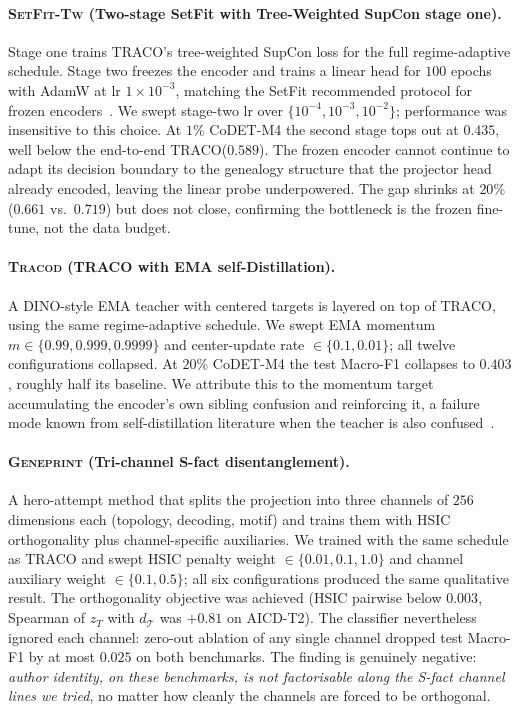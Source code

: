 ﻿\documentclass[11pt]{article}
\newcommand{\method}{\textsc{TRACO}\xspace}
\begin{document}
\paragraph{\textsc{SetFit-Tw} (Two-stage SetFit with Tree-Weighted
SupCon stage one).} Stage one trains \method's tree-weighted SupCon
loss for the full regime-adaptive schedule. Stage two freezes the
encoder and trains a linear head for $100$ epochs with AdamW at lr
$1\!\times\!10^{-3}$, matching the SetFit recommended protocol for
frozen encoders~\citep{tunstall2022setfit}. We swept stage-two lr
over $\{10^{-4}, 10^{-3}, 10^{-2}\}$; performance was insensitive
to this choice. At $1\%$ CoDET-M4 the second stage tops out at
$0.435$, well below the end-to-end \method ($0.589$). The frozen
encoder cannot continue to adapt its decision boundary to the
genealogy structure that the projector head already encoded, leaving
the linear probe underpowered. The gap shrinks at $20\%$ ($0.661$
vs.\ $0.719$) but does not close, confirming the bottleneck is the
frozen fine-tune, not the data budget.

\paragraph{\textsc{Tracod} (TRACO with EMA self-Distillation).} A
DINO-style EMA teacher with centered targets is layered on top of
\method, using the same regime-adaptive schedule. We swept EMA
momentum $m \in \{0.99, 0.999, 0.9999\}$ and center-update rate
$\in \{0.1, 0.01\}$; all twelve configurations collapsed.
At $20\%$ CoDET-M4 the test Macro-F1 collapses to $0.403$,
roughly half its baseline. We attribute this to the momentum target
accumulating the encoder's own sibling confusion and reinforcing it, a failure mode known from self-distillation literature when
the teacher is also confused~\citep{grill2020byol}.

\paragraph{\textsc{Geneprint} (Tri-channel S-fact disentanglement).}
A hero-attempt method that splits the projection into three
channels of $256$ dimensions each (topology, decoding, motif) and
trains them with HSIC orthogonality plus channel-specific
auxiliaries. We trained with the same schedule as \method and swept
HSIC penalty weight $\in \{0.01, 0.1, 1.0\}$ and channel auxiliary
weight $\in \{0.1, 0.5\}$; all six configurations produced the same
qualitative result. The orthogonality objective was achieved (HSIC
pairwise below $0.003$, Spearman of $z_T$ with $d_{\mathcal{T}}$
was $+0.81$ on AICD-T2). The classifier nevertheless ignored each
channel: zero-out ablation of any single channel dropped test
Macro-F1 by at most $0.025$ on both benchmarks. The finding is
genuinely negative: \emph{author identity, on these benchmarks, is
not factorisable along the S-fact channel lines we tried}, no
matter how cleanly the channels are forced to be orthogonal.
\end{document}
